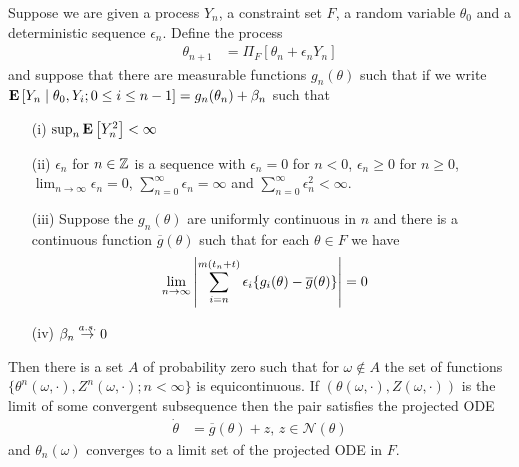 \begin{thm}Suppose we are given a process $Y_n$, a constraint set $F$, a random variable $\theta_0$ and a deterministic sequence $\epsilon_n$.  Define the process 
\begin{align*}
\theta_{n+1} &= \Pi_F \left[\theta_{n} + \epsilon_n Y_n \right]
\end{align*}
and suppose that there are measurable functions $g_n(\theta)$ such that if we write $\cexpectationlong{\theta_0, Y_i; 0 \leq i \leq n-1}{Y_n} = g_n(\theta_n) + \beta_n$ such that
\begin{itemize}
\item[(i)] $\sup_n \expectation{Y_n^2} < \infty$
\item[(ii)] $\epsilon_n$ for $n \in \integers$ is a sequence with $\epsilon_n = 0$ for $n < 0$, $\epsilon_n \geq 0$ for $n \geq 0$, $\lim_{n \to \infty} \epsilon_n = 0$,  $\sum_{n=0}^\infty \epsilon_n = \infty$ and $\sum_{n=0}^\infty \epsilon^2_n < \infty$.  
\item[(iii)] Suppose the $g_n(\theta)$ are uniformly continuous in $n$ and there is a continuous function $\overline{g}(\theta)$ such that for each $\theta \in F$ we have
\begin{align*}
\lim_{n \to \infty} \abs{\sum_{i=n}^{m(t_n+t)} \epsilon_i \lbrace g_i(\theta) - \overline{g}(\theta) \rbrace }&= 0
\end{align*}
\item[(iv)] $\beta_n \toas 0$
\end{itemize}
Then there is a set $A$ of probability zero such that for $\omega \notin A$ the set of functions $\lbrace \theta^n(\omega, \cdot), Z^n(\omega, \cdot); n < \infty \rbrace$ is equicontinuous.  If $(\theta(\omega, \cdot), Z(\omega, \cdot))$ is the limit of some convergent subsequence then the pair satisfies the projected ODE 
\begin{align*}
\dot{\theta} &= \overline{g}(\theta) + z \text{, $z \in \mathcal{N}(\theta)$}
\end{align*}
and $\theta_n(\omega)$ converges to a limit set of the projected ODE in $F$.  
\end{thm}
